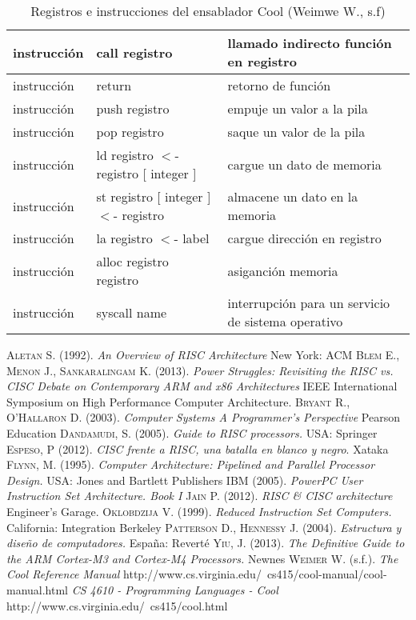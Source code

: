 \documentclass[10pt,a4paper]{article}
\begin{document}
\begin{center}
\begin{table}
\begin{tabular}{| l | l | p{5cm} |}
instrucción & call registro & llamado indirecto función en registro \\ \hline
instrucción & return & retorno de función \\ \hline
instrucción & push registro & empuje un valor a la pila\\ \hline
instrucción & pop registro & saque un valor de la pila \\ \hline
instrucción & ld registro $<$- registro [ integer ] & cargue un dato de memoria  \\ \hline
instrucción & st registro [ integer ] $<$- registro & almacene un dato en la memoria \\ \hline
instrucción & la registro $<$- label & cargue dirección en registro\\ \hline
instrucción & alloc registro registro & asiganción memoria  \\ \hline
instrucción & syscall name & interrupción para un servicio de sistema operativo\\
\hline 
\end{tabular}
\caption{Registros e instrucciones del ensablador Cool (Weimwe W., s.f)}
\end{table}
\end{center}

\begin{thebibliography}{X}
\bibitem{}\textsc{Aletan S.} (1992). \textit{An Overview of RISC Architecture} New York: ACM
\bibitem{}\textsc{Blem E., Menon J., Sankaralingam K.} (2013). \textit{Power Struggles: Revisiting the RISC vs. CISC Debate on Contemporary ARM and x86 Architectures} IEEE International Symposium on High Performance Computer Architecture.
\bibitem{} \textsc{Bryant R., O’Hallaron D.} (2003). \textit{Computer Systems A Programmer’s Perspective} Pearson Education
\bibitem{}\textsc{Dandamudi, S.} (2005). \textit{Guide to RISC processors.} USA: Springer
 \textsc{Espeso, P} (2012). \textit{CISC frente a RISC, una batalla en blanco y negro}. Xataka
\bibitem{}\textsc{Flynn, M.} (1995). \textit{Computer Architecture: Pipelined and Parallel Processor Design.} USA: Jones and Bartlett Publishers
\bibitem{}\textsc{IBM} (2005). \textit{PowerPC User Instruction Set Architecture. Book I} 
\bibitem{}\textsc{Jain P.} (2012). \textit{RISC \& CISC architecture} Engineer's Garage.
\bibitem{}\textsc{Oklobdzija V.} (1999). \textit{Reduced Instruction Set Computers.} California: Integration Berkeley
\bibitem{}\textsc{Patterson D., Hennessy J.} (2004). \textit{Estructura y diseño de computadores.} España: Reverté
\bibitem{}\textsc{Yiu, J.} (2013). \textit{The Definitive Guide to the ARM Cortex-M3 and Cortex-M4 Processors.} Newnes
\bibitem{}\textsc{Weimer W.} (s.f.). \textit{The Cool Reference Manual} http://www.cs.virginia.edu/~cs415/cool-manual/cool-manual.html
\bibitem{} \textit{CS 4610 - Programming Languages - Cool} http://www.cs.virginia.edu/~cs415/cool.html
\end{thebibliography}
\end{document}
